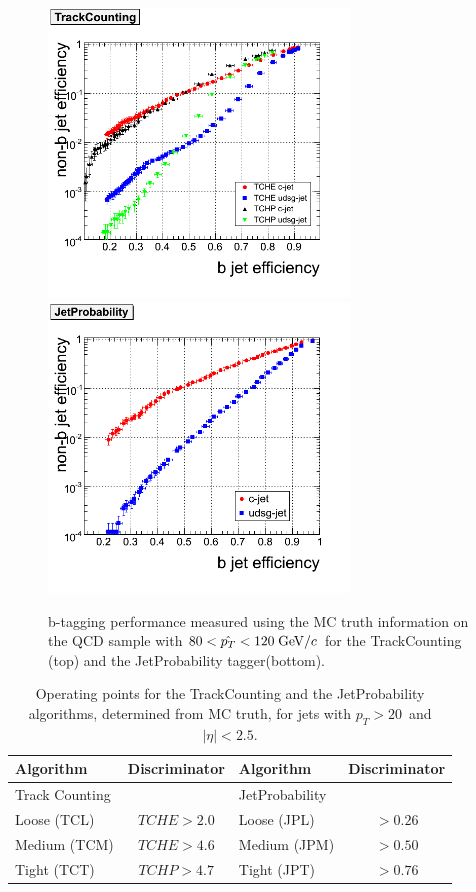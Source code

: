 \begin{figure}[htbp]
  \begin{center}
    \includegraphics[width=80mm]{Figures/Performance_plot_TC.png}
    \includegraphics[width=80mm]{Figures/Performance_plot_TP.png}
  \end{center}
  \caption{b-tagging performance measured using the MC truth information 
on the QCD sample with $80<\hat{p_T}<120\;{\rm GeV}/c$ for the TrackCounting 
(top) and the JetProbability tagger(bottom).}
  \label{fig:Performance_plots}
\end{figure}

\begin{table} [th]
\begin{center}
\begin{tabular}{|l|c|l|c|} 
\hline
Algorithm         & Discriminator & Algorithm      & Discriminator\\ \hline
Track Counting    &               & JetProbability &              \\
Loose  (TCL)      &  $TCHE>2.0$   & Loose  (JPL)   &  $>0.26$\\ 
Medium (TCM)      &  $TCHE>4.6$   & Medium (JPM)   &  $>0.50$\\ 
Tight  (TCT)      &  $TCHP>4.7$   & Tight  (JPT)   &  $>0.76$\\ 
\hline
\end{tabular}
\caption{\label{tab:OperatingPoints} 
 Operating points for the TrackCounting and the JetProbability algorithms,
 determined  from MC truth, for jets with $p_T>20$~\gevc and $|\eta|<2.5$.}
 \end{center}
\end{table}

\clearpage
